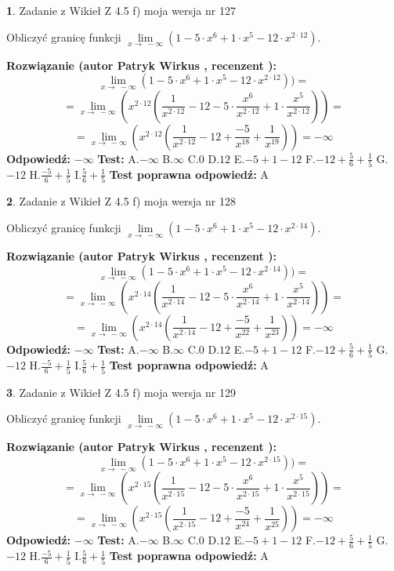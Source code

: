 \documentclass[12pt, a4paper]{article}
\theoremstyle{definition} %
\newtheorem{zad}{}
\newcommand{\zadStart}[1]{\begin{zad}#1\newline}
\newcommand{\zadStop}{\end{zad}}
\newcommand{\rozwStart}[2]{\noindent \textbf{Rozwiązanie (autor #1 , recenzent #2): }\newline}
\newcommand{\rozwStop}{\newline}
\newcommand{\odpStart}{\noindent \textbf{Odpowiedź:}\newline}
\newcommand{\odpStop}{\newline}
\newcommand{\testStart}{\noindent \textbf{Test:}\newline}
\newcommand{\testStop}{\newline}
\newcommand{\kluczStart}{\noindent \textbf{Test poprawna odpowiedź:}\newline}
\newcommand{\kluczStop}{\newline}
\begin{document}
\zadStart{Zadanie z Wikieł Z 4.5 f) moja wersja nr 127}



Obliczyć granicę funkcji  $\lim\limits_{x\to\ -\infty}(1 - 5 \cdot x^{6}+1 \cdot x^{5}- 12 \cdot x^{2\cdot12})$.
\zadStop
\rozwStart{Patryk Wirkus}{}
$$\lim\limits_{x\to\ -\infty}(1 - 5 \cdot x^{6}+1 \cdot x^{5}- 12 \cdot x^{2\cdot12}))=$$
$$=\lim\limits_{x\to\ -\infty}(x^{2\cdot12}(\frac{1}{x^{2\cdot12}}-12 -5 \cdot \frac{x^{6}}{x^{2\cdot12}}+1 \cdot \frac{x^{5}}{x^{2\cdot12}}))=$$
$$=\lim\limits_{x\to\ -\infty}(x^{2\cdot12}(\frac{1}{x^{2\cdot12}}-12 + \frac{-5}{x^{18}}+ \frac{1}{x^{19}}))=-\infty$$
\rozwStop
\odpStart
$-\infty$
\odpStop
\testStart
A.$-\infty$ B.$\infty$ C.$0$ D.$12$ E.$-5 + 1 - 12$
F.$-12+\frac{5}{6}+\frac{1}{5}$ G.$-12$
H.$\frac{-5}{6}+\frac{1}{5}$
I.$\frac{5}{6}+\frac{1}{5}$
\testStop
\kluczStart
A
\kluczStop



\zadStart{Zadanie z Wikieł Z 4.5 f) moja wersja nr 128}



Obliczyć granicę funkcji  $\lim\limits_{x\to\ -\infty}(1 - 5 \cdot x^{6}+1 \cdot x^{5}- 12 \cdot x^{2\cdot14})$.
\zadStop
\rozwStart{Patryk Wirkus}{}
$$\lim\limits_{x\to\ -\infty}(1 - 5 \cdot x^{6}+1 \cdot x^{5}- 12 \cdot x^{2\cdot14}))=$$
$$=\lim\limits_{x\to\ -\infty}(x^{2\cdot14}(\frac{1}{x^{2\cdot14}}-12 -5 \cdot \frac{x^{6}}{x^{2\cdot14}}+1 \cdot \frac{x^{5}}{x^{2\cdot14}}))=$$
$$=\lim\limits_{x\to\ -\infty}(x^{2\cdot14}(\frac{1}{x^{2\cdot14}}-12 + \frac{-5}{x^{22}}+ \frac{1}{x^{23}}))=-\infty$$
\rozwStop
\odpStart
$-\infty$
\odpStop
\testStart
A.$-\infty$ B.$\infty$ C.$0$ D.$12$ E.$-5 + 1 - 12$
F.$-12+\frac{5}{6}+\frac{1}{5}$ G.$-12$
H.$\frac{-5}{6}+\frac{1}{5}$
I.$\frac{5}{6}+\frac{1}{5}$
\testStop
\kluczStart
A
\kluczStop



\zadStart{Zadanie z Wikieł Z 4.5 f) moja wersja nr 129}



Obliczyć granicę funkcji  $\lim\limits_{x\to\ -\infty}(1 - 5 \cdot x^{6}+1 \cdot x^{5}- 12 \cdot x^{2\cdot15})$.
\zadStop
\rozwStart{Patryk Wirkus}{}
$$\lim\limits_{x\to\ -\infty}(1 - 5 \cdot x^{6}+1 \cdot x^{5}- 12 \cdot x^{2\cdot15}))=$$
$$=\lim\limits_{x\to\ -\infty}(x^{2\cdot15}(\frac{1}{x^{2\cdot15}}-12 -5 \cdot \frac{x^{6}}{x^{2\cdot15}}+1 \cdot \frac{x^{5}}{x^{2\cdot15}}))=$$
$$=\lim\limits_{x\to\ -\infty}(x^{2\cdot15}(\frac{1}{x^{2\cdot15}}-12 + \frac{-5}{x^{24}}+ \frac{1}{x^{25}}))=-\infty$$
\rozwStop
\odpStart
$-\infty$
\odpStop
\testStart
A.$-\infty$ B.$\infty$ C.$0$ D.$12$ E.$-5 + 1 - 12$
F.$-12+\frac{5}{6}+\frac{1}{5}$ G.$-12$
H.$\frac{-5}{6}+\frac{1}{5}$
I.$\frac{5}{6}+\frac{1}{5}$
\testStop
\kluczStart
A
\kluczStop
\end{document}
